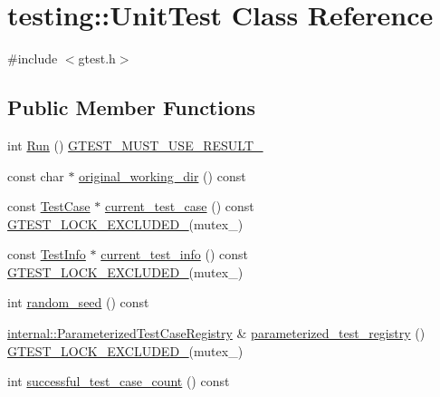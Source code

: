 \hypertarget{classtesting_1_1UnitTest}{}\section{testing\+::Unit\+Test Class Reference}
\label{classtesting_1_1UnitTest}


{\ttfamily \#include $<$gtest.\+h$>$}

\subsection*{Public Member Functions}
\begin{DoxyCompactItemize}
\item 
int \mbox{\hyperlink{classtesting_1_1UnitTest_a2febc800536b44500565f4c423f359d3}{Run}} () \mbox{\hyperlink{gtest-port_8h_a8e5aab8276b2645f64f41c9e3021b935}{G\+T\+E\+S\+T\+\_\+\+M\+U\+S\+T\+\_\+\+U\+S\+E\+\_\+\+R\+E\+S\+U\+L\+T\+\_\+}}
\item 
const char $\ast$ \mbox{\hyperlink{classtesting_1_1UnitTest_af6809b7747785c80f7a2f31f6b39b152}{original\+\_\+working\+\_\+dir}} () const
\item 
const \mbox{\hyperlink{classtesting_1_1TestCase}{Test\+Case}} $\ast$ \mbox{\hyperlink{classtesting_1_1UnitTest_a2bf61896036ae03edbd7bceed14f9e18}{current\+\_\+test\+\_\+case}} () const \mbox{\hyperlink{gtest-port_8h_a69abff5a4efdd07bd5faebe3dd318d06}{G\+T\+E\+S\+T\+\_\+\+L\+O\+C\+K\+\_\+\+E\+X\+C\+L\+U\+D\+E\+D\+\_\+}}(mutex\+\_\+)
\item 
const \mbox{\hyperlink{classtesting_1_1TestInfo}{Test\+Info}} $\ast$ \mbox{\hyperlink{classtesting_1_1UnitTest_a088eaf814a33085ace3d881d22e6bdea}{current\+\_\+test\+\_\+info}} () const \mbox{\hyperlink{gtest-port_8h_a69abff5a4efdd07bd5faebe3dd318d06}{G\+T\+E\+S\+T\+\_\+\+L\+O\+C\+K\+\_\+\+E\+X\+C\+L\+U\+D\+E\+D\+\_\+}}(mutex\+\_\+)
\item 
int \mbox{\hyperlink{classtesting_1_1UnitTest_adddc090a06f2d3a0e68f3762ee262688}{random\+\_\+seed}} () const
\item 
\mbox{\hyperlink{classtesting_1_1internal_1_1ParameterizedTestCaseRegistry}{internal\+::\+Parameterized\+Test\+Case\+Registry}} \& \mbox{\hyperlink{classtesting_1_1UnitTest_a8f9c5d0d9f1b6d23c94070944a43c550}{parameterized\+\_\+test\+\_\+registry}} () \mbox{\hyperlink{gtest-port_8h_a69abff5a4efdd07bd5faebe3dd318d06}{G\+T\+E\+S\+T\+\_\+\+L\+O\+C\+K\+\_\+\+E\+X\+C\+L\+U\+D\+E\+D\+\_\+}}(mutex\+\_\+)
\item 
int \mbox{\hyperlink{classtesting_1_1UnitTest_acaa2ab71f53c25ffe0242a91c14e173f}{successful\+\_\+test\+\_\+case\+\_\+count}} () const

\end{DoxyCompactItemize}
